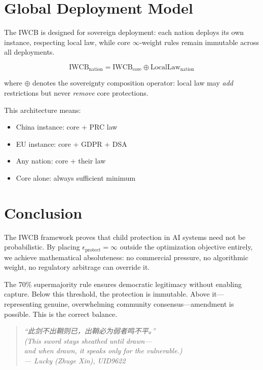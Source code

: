 \documentclass[conference]{IEEEtran}
\begin{document}
\section{Global Deployment Model}

The IWCB is designed for sovereign deployment:
each nation deploys its own instance, respecting
local law, while core $\infty$-weight rules
remain immutable across all deployments.

\begin{equation}
  \text{IWCB}_{\text{nation}} =
  \text{IWCB}_{\text{core}}
  \oplus \text{LocalLaw}_{\text{nation}}
  \label{eq:sovereign}
\end{equation}

where $\oplus$ denotes the sovereignty composition operator:
local law may \emph{add} restrictions but never
\emph{remove} core protections.

This architecture means:
\begin{itemize}
  \item China instance: core + PRC law
  \item EU instance: core + GDPR + DSA
  \item Any nation: core + their law
  \item Core alone: always sufficient minimum
\end{itemize}

\section{Conclusion}

The IWCB framework proves that child protection
in AI systems need not be probabilistic.
By placing $\epsilon_{\text{protect}} = \infty$
outside the optimization objective entirely,
we achieve mathematical absoluteness:
no commercial pressure, no algorithmic weight,
no regulatory arbitrage can override it.

The 70\% supermajority rule ensures democratic
legitimacy without enabling capture.
Below this threshold, the protection is immutable.
Above it---representing genuine, overwhelming
community consensus---amendment is possible.
This is the correct balance.

\begin{quote}
\itshape
``此剑不出鞘则已，出鞘必为弱者鸣不平。''\\
(\emph{This sword stays sheathed until drawn---\\
and when drawn, it speaks only for the vulnerable.})\\
\quad --- Lucky (Zhuge Xin), UID9622
\end{quote}
\end{document}

